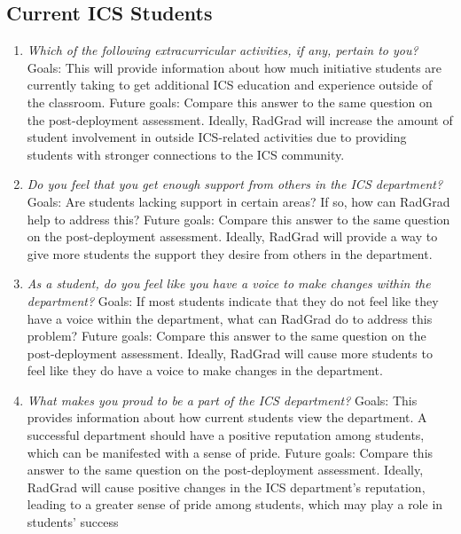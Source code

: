 \subsection{Current ICS Students}
\begin{enumerate}
\item \textit{Which of the following extracurricular activities, if any, pertain to you? }
Goals: This will provide information about how much initiative students are currently taking to get additional ICS education and experience outside of the classroom.
Future goals: Compare this answer to the same question on the post-deployment assessment. Ideally, RadGrad will increase the amount of student involvement in outside ICS-related activities due to providing students with stronger connections to the ICS community.
\item \textit{Do you feel that you get enough support from others in the ICS department?}
Goals: Are students lacking support in certain areas? If so, how can RadGrad help to address this? 
Future goals: Compare this answer to the same question on the post-deployment assessment. Ideally, RadGrad will provide a way to give more students the support they desire from others in the department. 
\item \textit{As a student, do you feel like you have a voice to make changes within the department?}
Goals: If most students indicate that they do not feel like they have a voice within the department, what can RadGrad do to address this problem?
Future goals: Compare this answer to the same question on the post-deployment assessment. Ideally, RadGrad will cause more students to feel like they do have a voice to make changes in the department.
\item \textit{What makes you proud to be a part of the ICS department?}
Goals: This provides information about how current students view the department. A successful department should have a positive reputation among students, which can be manifested with a sense of pride. 
Future goals: Compare this answer to the same question on the post-deployment assessment. Ideally, RadGrad will cause positive changes in the ICS department's reputation, leading to a greater sense of pride among students, which may play a role in students' success
\end{enumerate}

